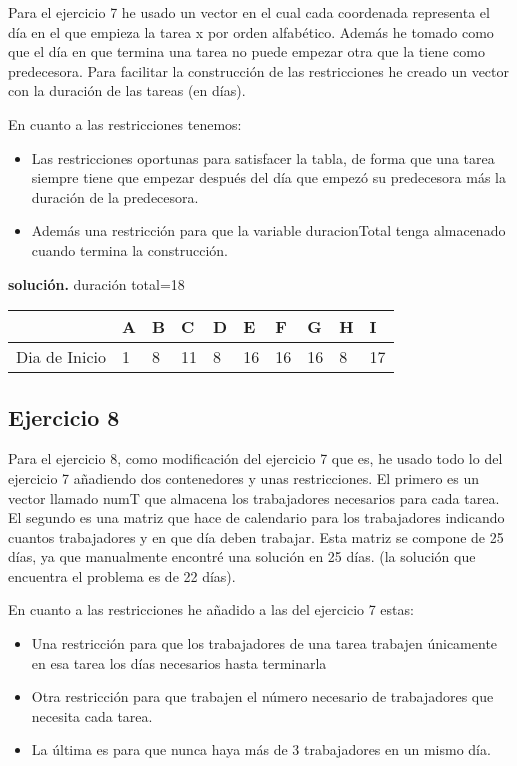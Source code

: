 \documentclass[a4paper,11pt]{article}
\begin{document}
Para el ejercicio 7 he usado un vector en el cual cada coordenada representa el día en el que empieza la tarea x por orden alfabético. Además he tomado como que el día en que termina una tarea no puede empezar otra que la tiene como predecesora. Para facilitar la construcción de las restricciones he creado un vector con la duración de las tareas (en días).

En cuanto a las restricciones tenemos:

\begin{itemize}
\item Las restricciones oportunas para satisfacer la tabla, de forma que una tarea siempre tiene que empezar después del día que empezó su predecesora más la duración de la predecesora.
\item Además una restricción para que la variable duracionTotal tenga almacenado cuando termina la construcción.
\end{itemize}

\textbf{solución.} duración total=18
\begin{table}[h]
\begin{tabular}{l|l|l|l|l|l|l|l|l|l|}
\cline{2-10}
                                    & A & B & C  & D & E  & F  & G  & H & I  \\ \hline
\multicolumn{1}{|l|}{Dia de Inicio} & 1 & 8 & 11 & 8 & 16 & 16 & 16 & 8 & 17 \\ \hline
\end{tabular}
\end{table}

\subsection{Ejercicio 8}
Para el ejercicio 8, como modificación del ejercicio 7 que es, he usado todo lo del ejercicio 7 añadiendo dos contenedores y unas restricciones. El primero es un vector llamado numT que almacena los trabajadores necesarios para cada tarea. El segundo es una matriz que hace de calendario para los trabajadores indicando cuantos trabajadores y en que día deben trabajar. Esta matriz se compone de 25 días, ya que manualmente encontré una solución en 25 días. (la solución que encuentra el problema es de 22 días).

En cuanto a las restricciones he añadido a las del ejercicio 7 estas:

\begin{itemize}
\item Una restricción para que los trabajadores de una tarea trabajen únicamente en esa tarea los días necesarios hasta terminarla
\item Otra restricción para que trabajen el número necesario de trabajadores que necesita cada tarea.
\item La última es para que nunca haya más de 3 trabajadores en un mismo día.
\end{itemize}
\end{document}
